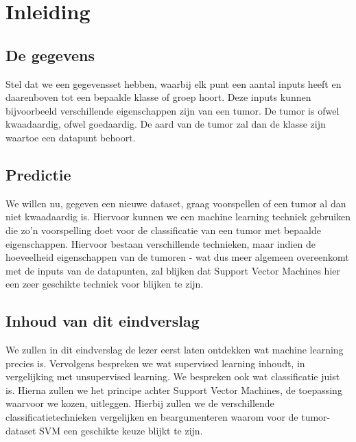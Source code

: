 \documentclass[TeamE-eindrapport]{subfiles}
\begin{document}
	
\chapter*{Inleiding}

	\section*{De gegevens}
	
	Stel dat we een gegevensset hebben, waarbij elk punt een aantal inputs heeft en daarenboven tot een bepaalde klasse of groep hoort. Deze inputs kunnen bijvoorbeeld verschillende eigenschappen zijn van een tumor. De tumor is ofwel kwaadaardig, ofwel goedaardig. De aard van de tumor zal dan de klasse zijn waartoe een datapunt behoort.
	
	\section*{Predictie}
	
	We willen nu, gegeven een nieuwe dataset, graag voorspellen of een tumor al dan niet kwaadaardig is. Hiervoor kunnen we een machine learning techniek gebruiken die zo'n voorspelling doet voor de classificatie van een tumor met bepaalde eigenschappen. Hiervoor bestaan verschillende technieken, maar indien de hoeveelheid eigenschappen van de tumoren - wat dus meer algemeen overeenkomt met de inputs van de datapunten, zal blijken dat Support Vector Machines hier een zeer geschikte techniek voor blijken te zijn.
	
	\section*{Inhoud van dit eindverslag}
	
	We zullen in dit eindverslag de lezer eerst laten ontdekken wat machine learning precies is. Vervolgens bespreken we wat supervised learning inhoudt, in vergelijking met unsupervised learning. We bespreken ook wat classificatie juist is. Hierna zullen we het principe achter Support Vector Machines, de toepassing waarvoor we kozen, uitleggen. Hierbij zullen we de verschillende classificatietechnieken vergelijken en beargumenteren waarom voor de tumor-dataset SVM een geschikte keuze blijkt te zijn.
	
\end{document}
